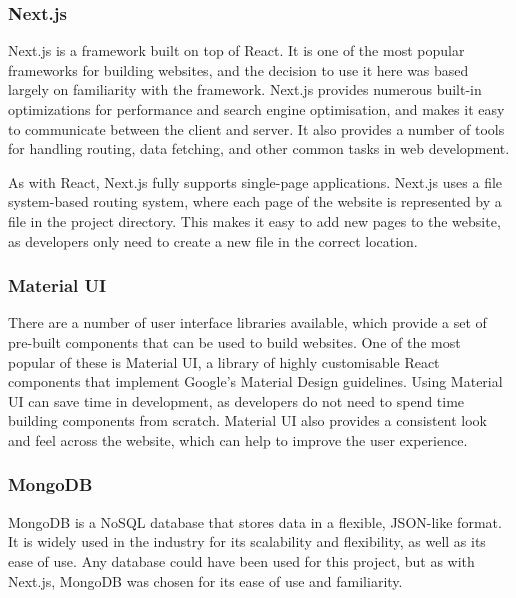 \documentclass[../main.tex]{subfiles}
\begin{document}
            \subsubsection{Next.js}
                Next.js is a framework built on top of React.
                It is one of the most popular frameworks for building websites, and the
                    decision to use it here was based largely on familiarity with the framework.
                Next.js provides numerous built-in optimizations for performance and search
                    engine optimisation, and makes it easy to communicate between the client and
                    server.
                It also provides a number of tools for handling routing, data fetching, and
                    other common tasks in web development.

                As with React, Next.js fully supports single-page applications.
                Next.js uses a file system-based routing system, where each page of the website
                    is represented by a file in the project directory.
                This makes it easy to add new pages to the website, as developers only need to
                    create a new file in the correct location.

            \subsubsection{Material UI}
                There are a number of user interface libraries available, which provide a set
                    of pre-built components that can be used to build websites.
                One of the most popular of these is Material UI, a library of highly
                    customisable React components that implement Google's Material Design
                    guidelines.
                Using Material UI can save time in development, as developers do not need to
                    spend time building components from scratch.
                Material UI also provides a consistent look and feel across the website, which
                    can help to improve the user experience.

            \subsubsection{MongoDB}
                MongoDB is a NoSQL database that stores data in a flexible, JSON-like format.
                It is widely used in the industry for its scalability and flexibility, as well
                    as its ease of use.
                Any database could have been used for this project, but as with Next.js,
                    MongoDB was chosen for its ease of use and familiarity.
\end{document}

